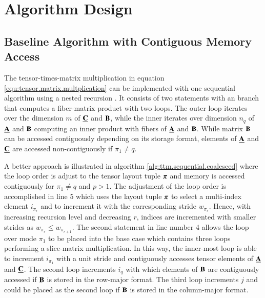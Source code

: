 \section{Algorithm Design}
\label{sec:design}
\subsection{Baseline Algorithm with Contiguous Memory Access}
\label{sec:design:modified.baseline.algorithm}
The tensor-times-matrix multiplication in equation \ref{equ:tensor.matrix.multplication} can be implemented with one sequential algorithm using a nested recursion \cite{bassoy:2018:fast}.
It consists of two  statements with an  branch that computes a fiber-matrix product with two loops.
The outer loop iterates over the dimension $m$ of $\underline{\mathbf{C}}$ and $\mathbf{B}$, while the inner iterates over dimension $n_q$ of $\underline{\mathbf{A}}$ and $\mathbf{B}$ computing an inner product with fibers of $\underline{\mathbf{A}}$ and $\mathbf{B}$. 
While matrix $\mathbf{B}$ can be accessed contiguously depending on its storage format, elements of $\underline{\mathbf{A}}$ and $\underline{\mathbf{C}}$ are accessed non-contiguously if $\pi_1 \neq q$.



A better approach is illustrated in algorithm \ref{alg:ttm.sequential.coalesced} where the loop order is adjust to the tensor layout tuple $\boldsymbol{\pi}$ and memory is accessed contiguously for $\pi_1 \neq q$ and $p > 1$.
The adjustment of the loop order is accomplished in line 5 which uses the layout tuple $\boldsymbol{\pi}$ to select a multi-index element $i_{\pi_r}$ and to increment it with the corresponding stride $w_{\pi_r}$.
Hence, with increasing recursion level and decreasing $r$, indices are incremented with smaller strides as $w_{\pi_r} \leq w_{\pi_{r+1}}$.
The second  statement in line number 4 allows the loop over mode $\pi_1$ to be placed into the base case which contains three loops performing a slice-matrix multiplication.
In this way, the inner-most loop is able to increment $i_{\pi_1}$ with a unit stride and contiguously accesses tensor elements of $\underline{\mathbf{A}}$ and $\underline{\mathbf{C}}$.
The second loop increments $i_q$ with which elements of $\mathbf{B}$ are contiguously accessed if $\mathbf{B}$ is stored in the row-major format.
The third loop increments $j$ and could be placed as the second loop if $\mathbf{B}$ is stored in the column-major format.

